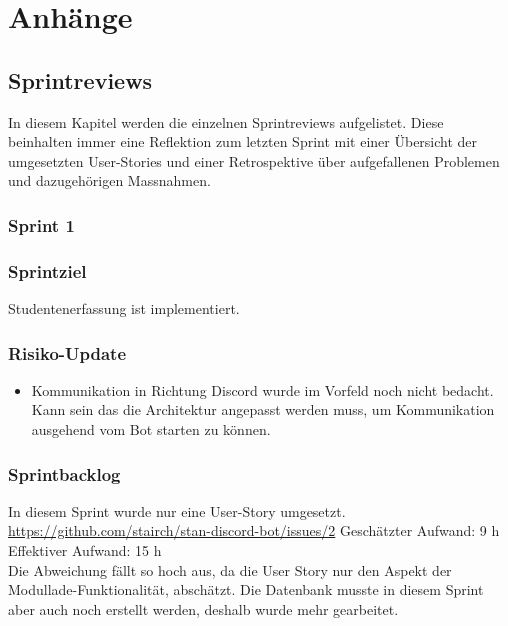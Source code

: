\documentclass[a4paper, table]{article}
\begin{document}
\newpage

\section{Anh\"ange}

\subsection{Sprintreviews}\label{Sprintreviews}
In diesem Kapitel werden die einzelnen Sprintreviews aufgelistet.
Diese beinhalten immer eine Reflektion zum letzten Sprint mit einer Übersicht der umgesetzten User-Stories und
einer Retrospektive über aufgefallenen Problemen und dazugehörigen Massnahmen.

\subsubsection{Sprint 1}
\subsubsection*{Sprintziel}
Studentenerfassung ist implementiert.

\subsubsection*{Risiko-Update}
\begin{itemize}
    \item Kommunikation in Richtung Discord wurde im Vorfeld noch nicht bedacht.
    Kann sein das die Architektur angepasst werden muss, um Kommunikation ausgehend vom Bot starten zu können.
\end{itemize}

\subsubsection*{Sprintbacklog}
In diesem Sprint wurde nur eine User-Story umgesetzt.\\
\url{https://github.com/stairch/stan-discord-bot/issues/2}
\newline
Geschätzter Aufwand: 9 h
\newline
Effektiver Aufwand: 15 h\\
Die Abweichung fällt so hoch aus, da die User Story nur den Aspekt der Modullade-Funktionalität, abschätzt.
Die Datenbank musste in diesem Sprint aber auch noch erstellt werden, deshalb wurde mehr gearbeitet.
\end{document}
